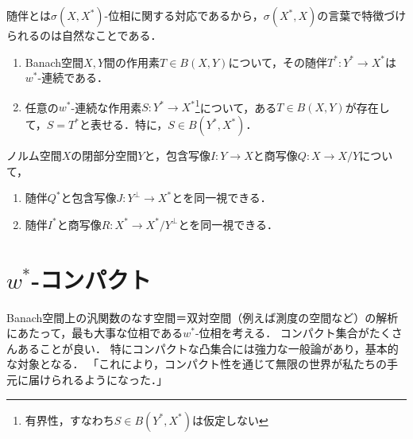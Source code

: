 \documentclass[uplatex,dvipdfmx]{jsreport}
\begin{document}
\begin{tcolorbox}[colframe=ForestGreen, colback=ForestGreen!10!white,breakable,colbacktitle=ForestGreen!40!white,coltitle=black,fonttitle=\bfseries\sffamily,
title=]
    随伴とは$\sigma(X,X^*)$-位相に関する対応であるから，$\sigma(X^*,X)$の言葉で特徴づけられるのは自然なことである．
\end{tcolorbox}

\begin{proposition}[随伴の特徴付け]\mbox{}
    \begin{enumerate}
        \item Banach空間$X,Y$間の作用素$T\in B(X,Y)$について，その随伴$T^*:Y^*\to X^*$は$w^*$-連続である．
        \item 任意の$w^*$-連続な作用素$S:Y^*\to X^*$\footnote{有界性，すなわち$S\in B(Y^*,X^*)$は仮定しない}について，ある$T\in B(X,Y)$が存在して，$S=T^*$と表せる．特に，$S\in B(Y^*,X^*)$．
    \end{enumerate}
\end{proposition}

\begin{proposition}\label{prop-標準写像の随伴}
    ノルム空間$X$の閉部分空間$Y$と，包含写像$I:Y\to X$と商写像$Q:X\to X/Y$について，
    \begin{enumerate}
        \item 随伴$Q^*$と包含写像$J:Y^\perp\to X^*$とを同一視できる．
        \item 随伴$I^*$と商写像$R:X^*\to X^*/Y^\perp$とを同一視できる．
    \end{enumerate}
\end{proposition}

\section{$w^*$-コンパクト}

\begin{tcolorbox}[colframe=ForestGreen, colback=ForestGreen!10!white,breakable,colbacktitle=ForestGreen!40!white,coltitle=black,fonttitle=\bfseries\sffamily,
title=この位相が，無限をコンパクトに翻訳し，取扱可能にしてくれる．]
    Banach空間上の汎関数のなす空間＝双対空間（例えば測度の空間など）の解析にあたって，最も大事な位相である$w^*$-位相を考える．
    コンパクト集合がたくさんあることが良い．
    特にコンパクトな凸集合には強力な一般論があり，基本的な対象となる．
    「これにより，コンパクト性を通じて無限の世界が私たちの手元に届けられるようになった．」\cite{作用素環}
\end{tcolorbox}
\end{document}
